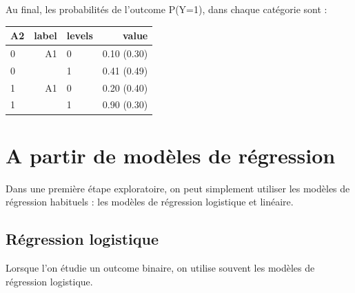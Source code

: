 \documentclass[
]{book}
\newenvironment{Shaded}{\begin{snugshade}}{\end{snugshade}}
\newcommand{\AttributeTok}[1]{\textcolor[rgb]{0.77,0.63,0.00}{#1}}
\newcommand{\CommentTok}[1]{\textcolor[rgb]{0.56,0.35,0.01}{\textit{#1}}}
\newcommand{\DecValTok}[1]{\textcolor[rgb]{0.00,0.00,0.81}{#1}}
\newcommand{\DocumentationTok}[1]{\textcolor[rgb]{0.56,0.35,0.01}{\textbf{\textit{#1}}}}
\newcommand{\FunctionTok}[1]{\textcolor[rgb]{0.00,0.00,0.00}{#1}}
\newcommand{\NormalTok}[1]{#1}
\newcommand{\OtherTok}[1]{\textcolor[rgb]{0.56,0.35,0.01}{#1}}
\newcommand{\SpecialCharTok}[1]{\textcolor[rgb]{0.00,0.00,0.00}{#1}}
\begin{document}
\begin{Shaded}
\end{Shaded}

Au final, les probabilités de l'outcome P(Y=1), dans chaque catégorie sont :

\begin{table}[!h]
\centering\begingroup\fontsize{9}{11}\selectfont

\begin{tabular}{lrlr}
\toprule
A2 & label & levels & value\\
\midrule
0 & A1 & 0 & 0.10 (0.30)\\
0 &  & 1 & 0.41 (0.49)\\
1 & A1 & 0 & 0.20 (0.40)\\
1 &  & 1 & 0.90 (0.30)\\
\bottomrule
\end{tabular}
\endgroup{}
\end{table}

\hypertarget{regression}{%
\chapter{A partir de modèles de régression}\label{regression}}

Dans une première étape exploratoire, on peut simplement utiliser les modèles de régression habituels : les modèles de régression logistique et linéaire.

\hypertarget{ruxe9gression-logistique}{%
\section{Régression logistique}\label{ruxe9gression-logistique}}

Lorsque l'on étudie un outcome binaire, on utilise souvent les modèles de régression logistique.
\end{document}
